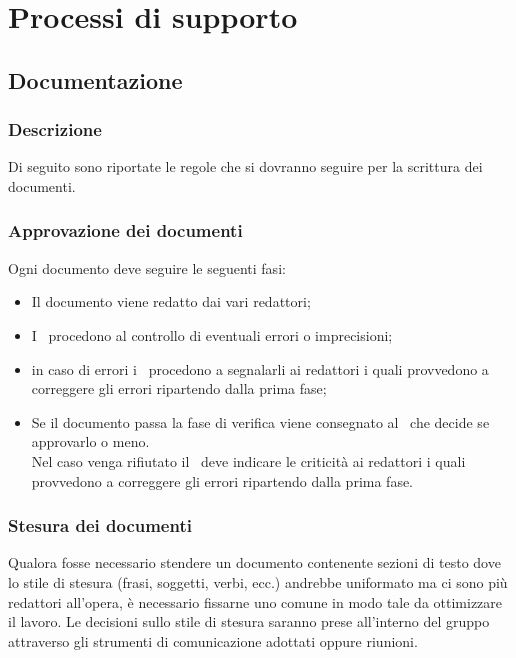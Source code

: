 \documentclass[../NormeDiProgetto.tex]{subfiles}
\begin{document}
	\section{Processi di supporto}
		\subsection{Documentazione}
			\subsubsection{Descrizione}
				Di seguito sono riportate le regole che si dovranno seguire per la scrittura
				dei documenti.
			\subsubsection{Approvazione dei documenti}
				Ogni documento deve seguire le seguenti fasi:
				\begin{itemize}
					\item Il documento viene redatto dai vari redattori;
					\item I \verificatori\ procedono al controllo di eventuali errori o
					imprecisioni;
					\item in caso di errori i \verificatori\ procedono a segnalarli ai redattori
					i quali provvedono a correggere gli errori ripartendo dalla prima fase;
					\item Se il documento passa la fase di verifica viene consegnato al
					\responsabilediprogetto\ che decide se approvarlo o meno.\\
					Nel caso venga rifiutato il \responsabilediprogetto\ deve indicare le
					criticità ai redattori i quali provvedono a correggere gli errori
					ripartendo dalla prima fase.
				\end{itemize}
			\subsubsection{Stesura dei documenti}
					Qualora fosse necessario stendere un documento contenente sezioni di testo dove lo stile
					di stesura (frasi, soggetti, verbi, ecc.) andrebbe uniformato ma ci sono più redattori
					all'opera, è necessario fissarne uno comune in modo tale da ottimizzare il lavoro.
					Le decisioni sullo stile di stesura saranno prese all'interno del gruppo attraverso
					gli strumenti di comunicazione adottati oppure riunioni.
\end{document}
